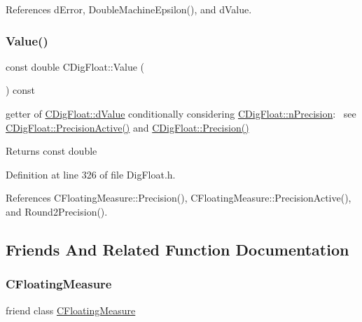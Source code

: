 References d\+Error, Double\+Machine\+Epsilon(), and d\+Value.

\mbox{\label{classCDigFloat_a308ccc3e3c96dd81977033e0a94344fd}} 
\subsubsection{\texorpdfstring{Value()}{Value()}\hspace{0.1cm}{\footnotesize\ttfamily [2/2]}}
{\footnotesize\ttfamily const double C\+Dig\+Float\+::\+Value (\begin{DoxyParamCaption}{ }\end{DoxyParamCaption}) const\hspace{0.3cm}{\ttfamily [inline]}}



getter of \hyperlink{classCDigFloat_a4bbe69e30dd4e20527362493aa9aaf96}{C\+Dig\+Float\+::d\+Value} conditionally considering \hyperlink{classCDigFloat_ad580654be35246d14c91482581c0bc11}{C\+Dig\+Float\+::n\+Precision}\+:~\newline
 see \hyperlink{classCDigFloat_a4d6ca24beda280be719374c2a6b2c64d}{C\+Dig\+Float\+::\+Precision\+Active()} and \hyperlink{classCDigFloat_a95875f6f7246debee0d00b0c41c82aee}{C\+Dig\+Float\+::\+Precision()} 

\begin{DoxyReturn}{Returns}
const double 
\end{DoxyReturn}


Definition at line 326 of file Dig\+Float.\+h.



References C\+Floating\+Measure\+::\+Precision(), C\+Floating\+Measure\+::\+Precision\+Active(), and Round2\+Precision().



\subsection{Friends And Related Function Documentation}
\mbox{\label{classCDigFloat_a7e23751869edf87edc0feeb80eda78d9}} 
\subsubsection{\texorpdfstring{C\+Floating\+Measure}{CFloatingMeasure}}
{\footnotesize\ttfamily friend class \hyperlink{classCFloatingMeasure}{C\+Floating\+Measure}\hspace{0.3cm}{\ttfamily [friend]}}



